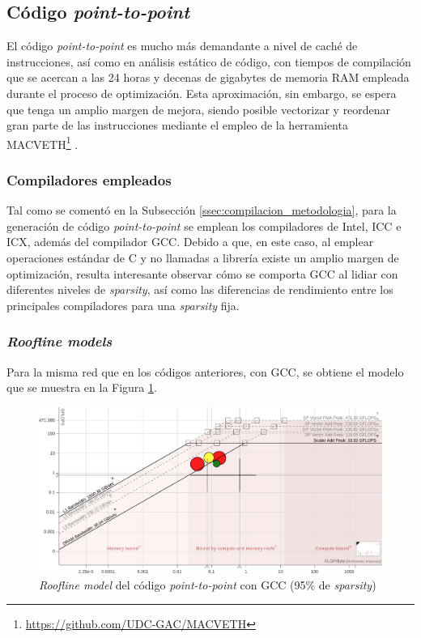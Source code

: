\subsection{Código \textit{point-to-point}}
\label{ssec:codigo_p2p_perfilado}
El código \textit{point-to-point} es mucho más demandante a nivel de caché de instrucciones, así como en análisis estático de código, con tiempos de compilación que se acercan a las 24 horas y decenas de gigabytes de memoria RAM empleada durante el proceso de optimización. Esta aproximación, sin embargo, se espera que tenga un amplio margen de mejora, siendo posible vectorizar y reordenar gran parte de las instrucciones mediante el empleo de la herramienta MACVETH\footnote{\url{https://github.com/UDC-GAC/MACVETH}} \cite{custom_high_performance_vector_codegen_sparse_computations}.

\subsubsection{Compiladores empleados}
Tal como se comentó en la Subsección \ref{ssec:compilacion_metodologia}, para la generación de código \textit{point-to-point} se emplean los compiladores de Intel, ICC e ICX, además del compilador GCC. Debido a que, en este caso, al emplear operaciones estándar de C y no llamadas a librería existe un amplio margen de optimización, resulta interesante observar cómo se comporta GCC al lidiar con diferentes niveles de \textit{sparsity}, así como las diferencias de rendimiento entre los principales compiladores para una \textit{sparsity} fija.

\subsubsection{\textit{Roofline models}}
Para la misma red que en los códigos anteriores, con GCC, se obtiene el modelo que se muestra en la Figura \ref{fig:roofline_p2p_gcc}.
\begin{figure}[h!]
    \centering
    \includegraphics[width=\textwidth]{img/rooflines/roofline_p2p_95.png}
    \caption{\textit{Roofline model} del código \textit{point-to-point} con GCC (95\% de \textit{sparsity})}
    \label{fig:roofline_p2p_gcc}
\end{figure}

